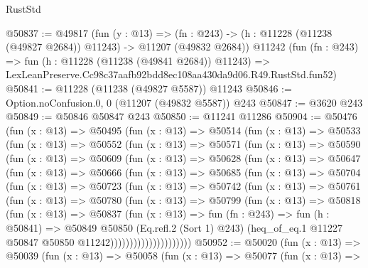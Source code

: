 \begin{lexlean}{RustStd}
\begin{coremodule}
@50837 := @49817
    (fun (y : @13) =>
    (fn : @243) -> (h : @11228 (@11238 (@49827 @2684)) @11243) -> @11207 (@49832 @2684))
    @11242
    (fun (fn : @243) =>
    fun (h : @11228 (@11238 (@49841 @2684)) @11243) =>
    LexLeanPreserve.Cc98c37aafb92bdd8ec108aa430da9d06.R49.RustStd.fun52)
@50841 := @11228 (@11238 (@49827 @5587)) @11243
@50846 := Option.noConfusion.{0, 0} (@11207 (@49832 @5587)) @243
@50847 := @3620 @243
@50849 := @50846 @50847 @243
@50850 := @11241 @11286
@50904 := @50476
    (fun (x : @13) =>
    @50495
      (fun (x : @13) =>
      @50514
        (fun (x : @13) =>
        @50533
          (fun (x : @13) =>
          @50552
            (fun (x : @13) =>
            @50571
              (fun (x : @13) =>
              @50590
                (fun (x : @13) =>
                @50609
                  (fun (x : @13) =>
                  @50628
                    (fun (x : @13) =>
                    @50647
                      (fun (x : @13) =>
                      @50666
                        (fun (x : @13) =>
                        @50685
                          (fun (x : @13) =>
                          @50704
                            (fun (x : @13) =>
                            @50723
                              (fun (x : @13) =>
                              @50742
                                (fun (x : @13) =>
                                @50761
                                  (fun (x : @13) =>
                                  @50780
                                    (fun (x : @13) =>
                                    @50799
                                      (fun (x : @13) =>
                                      @50818
                                        (fun (x : @13) =>
                                        @50837
                                          (fun (x : @13) =>
                                          fun (fn : @243) =>
                                          fun (h : @50841) =>
                                          @50849
                                            @50850
                                            (Eq.refl.{2} (Sort 1) @243)
                                            (heq_of_eq.{1}
                                              @11227
                                              @50847
                                              @50850
                                              @11242)))))))))))))))))))))
@50952 := @50020
    (fun (x : @13) =>
    @50039
      (fun (x : @13) =>
      @50058
        (fun (x : @13) =>
        @50077
          (fun (x : @13) =>

\end{coremodule}
\end{lexlean}
